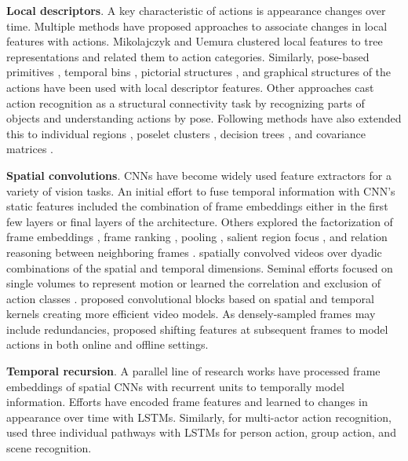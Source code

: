 \documentclass[smallextended,twocolumn,natbib]{svjour3}
\begin{document}
\noindent
\textbf{Local descriptors}. A key characteristic of actions is appearance changes over time. Multiple methods have proposed approaches to associate changes in local features with actions. Mikolajczyk and Uemura \citep{mikolajczyk2008action} clustered local features to tree representations and related them to action categories. Similarly, pose-based primitives \citep{thurau2008pose}, temporal bins \citep{nowozin2007discriminative}, pictorial structures \citep{tran2012part}, and graphical structures of the actions \citep{ni2014multiple} have been used with local descriptor features. Other approaches \citep{gupta2009observing,yao2010modeling} cast action recognition as a structural connectivity task by recognizing parts of objects and understanding actions by pose.
Following methods have also extended this to individual regions \citep{ikizler2010object}, poselet clusters \citep{pishchulin2013strong}, decision trees \citep{rahmani2014real}, and covariance matrices \citep{kviatkovsky2014online}.  


\noindent
\textbf{Spatial convolutions}. CNNs have become widely used feature extractors for a variety of vision tasks. An initial effort \citep{karpathy2014large} to fuse temporal information with CNN's static features included the combination of frame embeddings either in the first few layers or final layers of the architecture. Others explored the factorization of frame embeddings \citep{sun2015human}, frame ranking \citep{fernando2015modeling}, pooling \citep{fernando2016rank}, salient region focus \citep{girdhar2017attentional, zong2021motion}, and relation reasoning between neighboring frames \citep{zhou2018temporal}. \citet{le2011learning} spatially convolved videos over dyadic combinations of the spatial and temporal dimensions. Seminal efforts focused on single volumes to represent motion \citep{bilen2016dynamic,chung2016signs,iosifidis2012view} or learned the correlation and exclusion of action classes \citep{hoai2015improving}. \citet{tran2018closer} proposed convolutional blocks based on spatial and temporal kernels creating more efficient video models. As densely-sampled frames may include redundancies, \citet{lin2019tsm} proposed shifting features at subsequent frames to model actions in both online and offline settings.
\citep{sudhakaran2020gate}


\noindent
\textbf{Temporal recursion}. A parallel line of research works have processed frame embeddings of spatial CNNs with recurrent units \citep{ballas2015delving,dwibedi2018temporal,yue2015beyond,ullah2017action} to temporally model information. Efforts \citet{donahue2015long,srivastava2015unsupervised} have encoded frame features and learned to changes in appearance over time with LSTMs. Similarly, for multi-actor action recognition, \citet{wang2017recurrent} used three individual pathways with LSTMs for person action, group action, and scene recognition.
\end{document}
